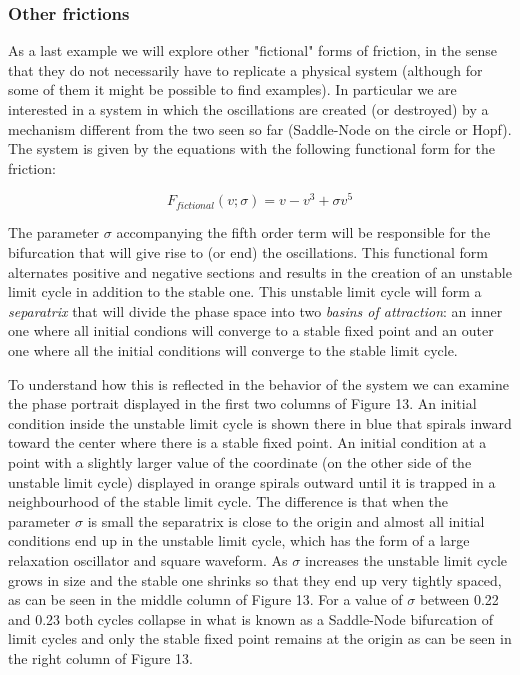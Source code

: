 \documentclass{article}
\begin{document}
\subsubsection{Other frictions}

As a last example we will explore other "fictional" forms of friction, in the sense that they do not necessarily have to replicate a physical system (although for some of them it might be possible to find examples). 
In particular we are interested in a system in which the oscillations are created (or destroyed) by a mechanism different from the two seen so far (Saddle-Node on the circle or Hopf). 
The system is given by the equations with the following functional form for the friction:

\begin{equation} \label{eq_fictional}
    F_{fictional}(v;\sigma) = v - v^3 + \sigma v^5  
\end{equation}

The parameter $\sigma$ accompanying the fifth order term will be responsible for the bifurcation that will give rise to (or end) the oscillations.
This functional form alternates positive and negative sections and results in the creation of an unstable limit cycle in addition to the stable one. 
This unstable limit cycle will form a {\em separatrix} that will divide the phase space into two {\em basins of attraction}: an inner one where all initial condions will converge to a stable fixed point and an outer one where all the initial conditions will converge to the stable limit cycle. 

To understand how this is reflected in the behavior of the system we can examine the phase portrait displayed in the first two columns of Figure 13. 
An initial condition inside the unstable limit cycle is shown there in blue that spirals inward toward the center where there is a stable fixed point. 
An initial condition at a point with a slightly larger value of the coordinate (on the other side of the unstable limit cycle) displayed in orange spirals outward until it is trapped in a neighbourhood of the stable limit cycle. 
The difference is that when the parameter $\sigma$ is small the separatrix is close to the origin and almost all initial conditions end up in the unstable limit cycle, which has the form of a large relaxation oscillator and square waveform. 
As $\sigma$ increases the unstable limit cycle grows in size and the stable one shrinks so that they end up very tightly spaced, as can be seen in the middle column of Figure 13. 
For a value of $\sigma$ between 0.22 and 0.23 both cycles collapse in what is known as a Saddle-Node bifurcation of limit cycles and only the stable fixed point remains at the origin as can be seen in the right column of Figure 13. 
\end{document}
